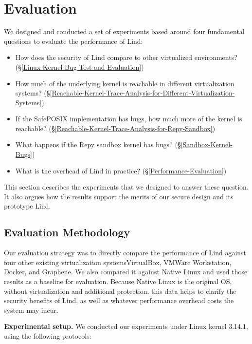\section{Evaluation}
\label{sec.evaluation}

We designed and conducted a set of experiments based around four fundamental questions to evaluate the performance of Lind:

\begin{itemize}
\item How does the security of Lind compare to other virtualized environments?
(\S{\ref{Linux-Kernel-Bug-Test-and-Evaluation}})

\item How much of the underlying kernel is reachable in different
virtualization systems?
(\S{\ref{Reachable-Kernel-Trace-Analysis-for-Different-Virtualization-Systems}})

\item If the SafePOSIX implementation has bugs, how much more of the kernel is
reachable?
(\S{\ref{Reachable-Kernel-Trace-Analysis-for-Repy-Sandbox}})

\item What happens if the Repy sandbox kernel has bugs?
(\S{\ref{Sandbox-Kernel-Bugs}})

\item What is the overhead of Lind in practice?
(\S{\ref{Performance-Evaluation}})
\end{itemize}

This section describes the experiments that we designed to answer these
question. It also argues how the results support the merits of our secure design and its prototype Lind.

\subsection{Evaluation Methodology}

Our evaluation strategy was to directly compare the performance of Lind
against
four other existing virtualization systems\textendash VirtualBox, VMWare
Workstation,
Docker, and Graphene. We also compared it against Native Linux and used
those results as a baseline for evaluation. Because Native Linux is the
original OS,
without virtualization and additional protection, this data helps to
clarify the security benefits of Lind,
as well as whatever performance overhead costs the system may incur.

\textbf{Experimental setup.}
We conducted our experiments under Linux kernel 3.14.1, using the following
protocols:

